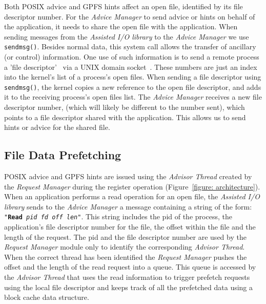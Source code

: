 Both POSIX advice and GPFS hints affect an open file, identified by its file descriptor number. For the \textit{Advice Manager} to send advice or hints on behalf of the application, it needs to share the open file with the application. When sending messages from 
the \textit{Assisted I/O library} to the \textit{Advice Manager} we use \texttt{sendmsg()}. Besides normal data, this system call allows the transfer of ancillary (or control) information. One use of such information is to send a remote process a 
'file descriptor'~\cite{StevensR13} via a UNIX domain socket~\cite{UnixSock}. These numbers are just an index into the kernel's list of a process's open files. When sending a file descriptor using \texttt{sendmsg()}, the kernel copies a new reference to the open 
file descriptor, and adds it to the receiving process's open files list. The \textit{Advice Manager} receives a new file descriptor number, (which will likely be different to the number sent), which points to a file descriptor shared with the application. This 
allows us to send hints or advice for the shared file.

\subsection{File Data Prefetching}
\label{subsec: data_prefetching}
POSIX advice and GPFS hints are issued using the \textit{Advisor Thread} created by the \textit{Request Manager} during the register operation (Figure~\ref{figure: architecture}). When an application performs a read operation for an open file, the 
\textit{Assisted I/O library} sends to the \textit{Advice Manager} a message containing a string of the form: \texttt{"\textbf{Read} \textit{pid} \textit{fd} \textit{off} \textit{len}"}. This string includes the pid of the process, the application's file 
descriptor number for the file, the offset within the file and the length of the request. The pid and the file descriptor number are used by the \textit{Request Manager} module only to identify the corresponding \textit{Advisor Thread}. When the correct 
thread has been identified the \textit{Request Manager} pushes the offset and the length of the read request into a queue. This queue is accessed by the \textit{Advisor Thread} that uses the read information to trigger prefetch requests using the local file 
descriptor and keeps track of all the prefetched data using a block cache data structure. %

